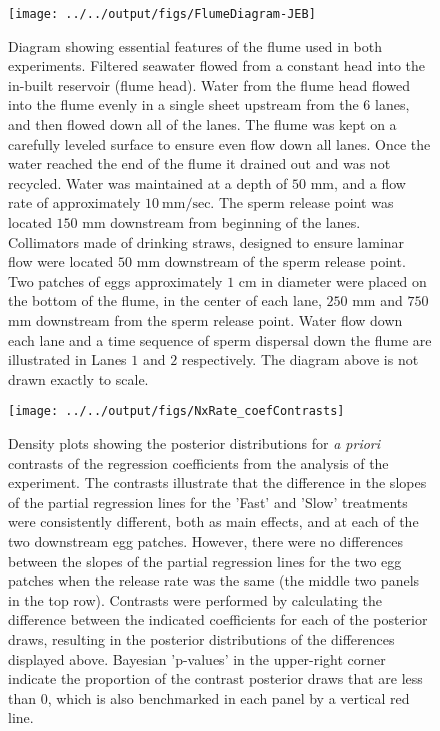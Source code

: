 \documentclass{article}
\begin{document}
\begin{figure}[!ht]
\texttt{[image: ../../output/figs/FlumeDiagram-JEB]}
\caption{Diagram showing essential features of the flume used in both experiments. Filtered seawater flowed from a constant head into the in-built reservoir (flume head). Water from the flume head flowed into the flume evenly in a single sheet upstream from the $6$ lanes, and then flowed down all of the lanes. The flume was kept on a carefully leveled surface to ensure even flow down all lanes. Once the water reached the end of the flume it drained out and was not recycled. Water was maintained at a depth of $50$ mm, and a flow rate of approximately $10~\text{mm}/\text{sec.}$ The sperm release point was located $150$ mm downstream from beginning of the lanes. Collimators made of drinking straws, designed to ensure laminar flow were located $50$ mm downstream of the sperm release point. Two patches of eggs approximately $1$ cm in diameter were placed on the bottom of the flume, in the center of each lane, $250$ mm and $750$ mm downstream from the sperm release point. Water flow down each lane and a time sequence of sperm dispersal down the flume are illustrated in Lanes $1$ and $2$ respectively. The diagram above is not drawn exactly to scale.}
\label{fig:FlumeDiagram}
\end{figure}
\newpage{}


\begin{figure}[!ht]
\texttt{[image: ../../output/figs/NxRate\_coefContrasts]}
\caption{Density plots showing the posterior distributions for \textit{a priori} contrasts of the regression coefficients from the analysis of the  experiment. The contrasts illustrate that the difference in the slopes of the partial regression lines for the 'Fast' and 'Slow' treatments were consistently different, both as main effects, and at each of the two downstream egg patches. However, there were no differences between the slopes of the partial regression lines for the two egg patches when the release rate was the same (the middle two panels in the top row). Contrasts were performed by calculating the difference between the indicated coefficients for each of the posterior draws, resulting in the posterior distributions of the differences displayed above. Bayesian 'p-values' in the upper-right corner indicate the proportion of the contrast posterior draws that are less than $0$, which is also benchmarked in each panel by a vertical red line.}
\label{fig:coefContr}
\end{figure}
\newpage{}
\end{document}
